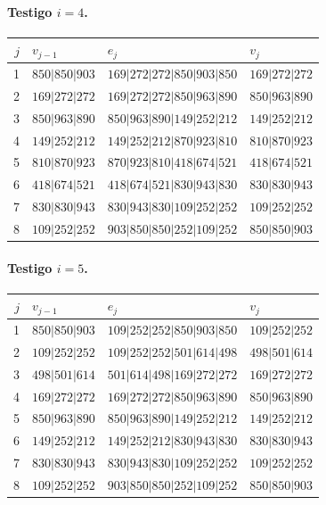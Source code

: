 \paragraph{Testigo \(i=4\).}
\begin{center}
\small
\begin{tabular}{rlll}
\hline
\(j\)&\(v_{j-1}\)&\(e_j\)&\(v_j\)\\
\hline
1&\(850|850|903\)&\(169|272|272|850|903|850\)&\(169|272|272\)\\
2&\(169|272|272\)&\(169|272|272|850|963|890\)&\(850|963|890\)\\
3&\(850|963|890\)&\(850|963|890|149|252|212\)&\(149|252|212\)\\
4&\(149|252|212\)&\(149|252|212|870|923|810\)&\(810|870|923\)\\
5&\(810|870|923\)&\(870|923|810|418|674|521\)&\(418|674|521\)\\
6&\(418|674|521\)&\(418|674|521|830|943|830\)&\(830|830|943\)\\
7&\(830|830|943\)&\(830|943|830|109|252|252\)&\(109|252|252\)\\
8&\(109|252|252\)&\(903|850|850|252|109|252\)&\(850|850|903\)\\
\hline
\end{tabular}
\end{center}

\paragraph{Testigo \(i=5\).}
\begin{center}
\small
\begin{tabular}{rlll}
\hline
\(j\)&\(v_{j-1}\)&\(e_j\)&\(v_j\)\\
\hline
1&\(850|850|903\)&\(109|252|252|850|903|850\)&\(109|252|252\)\\
2&\(109|252|252\)&\(109|252|252|501|614|498\)&\(498|501|614\)\\
3&\(498|501|614\)&\(501|614|498|169|272|272\)&\(169|272|272\)\\
4&\(169|272|272\)&\(169|272|272|850|963|890\)&\(850|963|890\)\\
5&\(850|963|890\)&\(850|963|890|149|252|212\)&\(149|252|212\)\\
6&\(149|252|212\)&\(149|252|212|830|943|830\)&\(830|830|943\)\\
7&\(830|830|943\)&\(830|943|830|109|252|252\)&\(109|252|252\)\\
8&\(109|252|252\)&\(903|850|850|252|109|252\)&\(850|850|903\)\\
\hline
\end{tabular}
\end{center}

